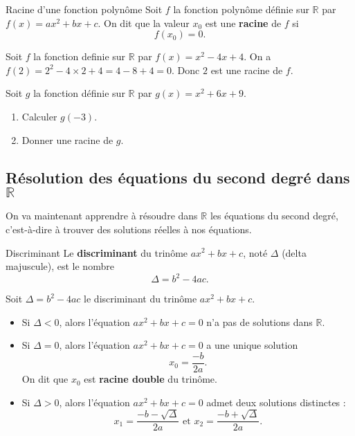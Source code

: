 \documentclass[11pt]{article}
\begin{document}
\begin{defi}{Racine d'une fonction polynôme}
  Soit $f$ la fonction polynôme définie sur $\mathbb{R}$ par $f(x) = ax^2+bx+c$.
  On dit que la valeur $x_0$ est une \textbf{racine} de $f$ si
  \[
    f(x_0) = 0.
  \]
\end{defi}

\begin{exemple}
  Soit $f$ la fonction definie sur $\mathbb{R}$ par $f(x)=x^2-4x+4$. On a $f(2)
  =2^2-4\times2+4=4-8+4=0$. Donc $2$ est une racine de $f$.
\end{exemple}

\begin{app}
  Soit $g$ la fonction définie sur $\mathbb{R}$ par $g(x)=x^2+6x+9$.
  \begin{enumerate}
    \item Calculer $g(-3)$.
    \item Donner une racine de $g$.
  \end{enumerate}
\end{app}

\subsection{Résolution des équations du second degré dans $\mathbb{R}$}

\noindent On va maintenant apprendre à résoudre dans $\mathbb{R}$ les équations du second
degré, c'est-à-dire à trouver des solutions réelles à nos équations.

\begin{defi}{Discriminant}
  Le \textbf{discriminant} du trinôme $ax^2+bx+c$, noté $\Delta$ (delta
  majuscule), est le nombre
  \[
    \Delta = b^2-4ac.
  \]
\end{defi}

\begin{prop}
  Soit $\Delta=b^2-4ac$ le discriminant du trinôme $ax^2+bx+c$.
  \begin{itemize}
    \item Si $\Delta<0$, alors l'équation $ax^2+bx+c=0$ n'a pas de solutions
      dans $\mathbb{R}$.
    \item Si $\Delta=0$, alors l'équation $ax^2+bx+c=0$ a une unique solution
      \[x_0 = \frac{-b}{2a}.\] On dit que $x_0$ est \textbf{racine double} du trinôme.
    \item Si $\Delta>0$, alors l'équation $ax^2+bx+c=0$ admet deux solutions
      distinctes : 
      \[
        x_1=\frac{-b-\sqrt\Delta}{2a}
        \text{ et }
        x_2=\frac{-b+\sqrt\Delta}{2a}.
      \]
  \end{itemize}
\end{prop}
\end{document}
